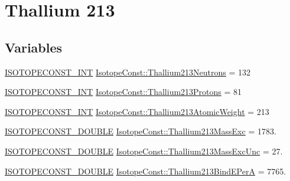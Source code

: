 \hypertarget{group___isotope_const-_thallium-_tl213}{}\section{Thallium 213}
\label{group___isotope_const-_thallium-_tl213}
\subsection*{Variables}
\begin{DoxyCompactItemize}
\item 
\mbox{\hyperlink{group___isotope_const-_macros_ga5f18360b3e99483a35c32d789e62621c}{I\+S\+O\+T\+O\+P\+E\+C\+O\+N\+S\+T\+\_\+\+I\+NT}} \mbox{\hyperlink{group___isotope_const-_thallium-_tl213_gacc670aacfc222b9ea4a5a3683cad66f3}{Isotope\+Const\+::\+Thallium213\+Neutrons}} = 132
\item 
\mbox{\hyperlink{group___isotope_const-_macros_ga5f18360b3e99483a35c32d789e62621c}{I\+S\+O\+T\+O\+P\+E\+C\+O\+N\+S\+T\+\_\+\+I\+NT}} \mbox{\hyperlink{group___isotope_const-_thallium-_tl213_gaa53efd24c97c17ab86cdb7e43cdb7f6d}{Isotope\+Const\+::\+Thallium213\+Protons}} = 81
\item 
\mbox{\hyperlink{group___isotope_const-_macros_ga5f18360b3e99483a35c32d789e62621c}{I\+S\+O\+T\+O\+P\+E\+C\+O\+N\+S\+T\+\_\+\+I\+NT}} \mbox{\hyperlink{group___isotope_const-_thallium-_tl213_ga4a7ad94dc850814df657d40d5abe8f88}{Isotope\+Const\+::\+Thallium213\+Atomic\+Weight}} = 213
\item 
\mbox{\hyperlink{group___isotope_const-_macros_ga8f45a7272ce02c0b4c65c44636ed719a}{I\+S\+O\+T\+O\+P\+E\+C\+O\+N\+S\+T\+\_\+\+D\+O\+U\+B\+LE}} \mbox{\hyperlink{group___isotope_const-_thallium-_tl213_ga4d51c8cd7683d538f7768137c6181e8e}{Isotope\+Const\+::\+Thallium213\+Mass\+Exc}} = 1783.
\item 
\mbox{\hyperlink{group___isotope_const-_macros_ga8f45a7272ce02c0b4c65c44636ed719a}{I\+S\+O\+T\+O\+P\+E\+C\+O\+N\+S\+T\+\_\+\+D\+O\+U\+B\+LE}} \mbox{\hyperlink{group___isotope_const-_thallium-_tl213_ga639716c12b7d05b06cf28e76a7e08728}{Isotope\+Const\+::\+Thallium213\+Mass\+Exc\+Unc}} = 27.
\item 
\mbox{\hyperlink{group___isotope_const-_macros_ga8f45a7272ce02c0b4c65c44636ed719a}{I\+S\+O\+T\+O\+P\+E\+C\+O\+N\+S\+T\+\_\+\+D\+O\+U\+B\+LE}} \mbox{\hyperlink{group___isotope_const-_thallium-_tl213_ga40fa2023660bf8ea2247f623b7a4becc}{Isotope\+Const\+::\+Thallium213\+Bind\+E\+PerA}} = 7765.
\item 

\end{DoxyCompactItemize}
